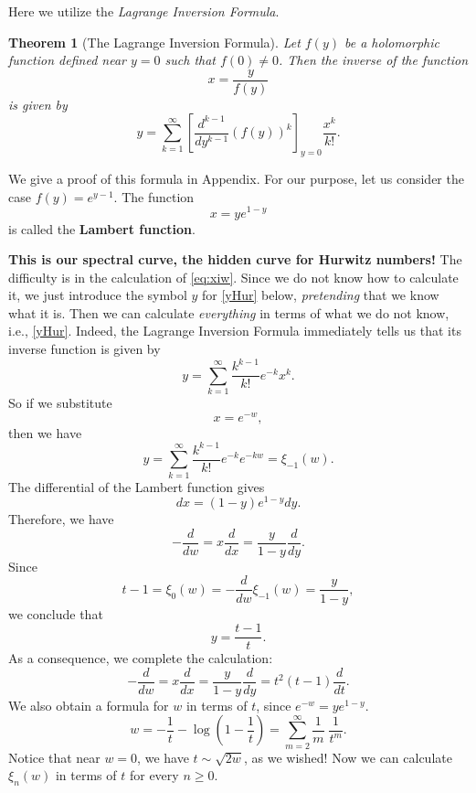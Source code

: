 \documentclass{amsart}
\newtheorem{thm}{Theorem}[section]
\theoremstyle{definition}
\numberwithin{equation}{section}
\numberwithin{figure}{section}
\newcommand{\be}{\begin{equation}}
\newcommand{\ee}{\end{equation}}
\begin{document}
Here we utilize the \emph{Lagrange Inversion Formula}.
\begin{thm}[The Lagrange Inversion Formula]
\label{thm:L}
Let $f(y)$ be a holomorphic function 
defined near $y=0$ such that $f(0)\ne 0$. 
Then the inverse of the function 
$$
x= \frac{y}{f(y)}
$$
is given by
$$
y=\sum_{k=1} ^\infty
\left[
\frac{d^{k-1}}{dy^{k-1}}(f(y))^k
\right]_{y=0}
\frac{x^k}{k!}.
$$
\end{thm}



We give a proof of this formula in Appendix.
For our purpose, let us consider 
the case $f(y) = e^{y-1}$. The function
\begin{equation}
\label{eq:Lambert}
x = y e^{1-y}
\end{equation}
is called the \textbf{Lambert function}. 


\textbf{This is our spectral curve, the hidden curve for Hurwitz numbers!}
The difficulty is in the calculation of \eqref{eq:xiw}. Since we do not know
how to calculate it, we just introduce the symbol $y$ for \eqref{yHur}
below, \emph{pretending} that we know what it is. Then we
can calculate \emph{everything} in terms of what we do not know, i.e.,
\eqref{yHur}. Indeed,
the Lagrange Inversion Formula 
immediately tells us that
its inverse function is given by
\be
\label{yHur}
y= \sum_{k=1} ^\infty \frac{k^{k-1}}{k!}e^{-k}
x^k.
\ee
So if we substitute 
\begin{equation}
\label{eq:x}
x = e^{-w},
\end{equation}
then we have
\begin{equation}
\label{eq:y}
y=\sum_{k=1} ^\infty \frac{k^{k-1}}{k!}e^{-k}
e^{-kw} = \xi_{-1}(w).
\end{equation}
The differential of the Lambert function gives
$$
dx = (1-y)e^{1-y} dy.
$$
Therefore, we have
\begin{equation}
\label{eq:wxy}
-\frac{d}{dw}=x\frac{d}{dx}=
\frac{y}{1-y}\frac{d}{dy}.
\end{equation}
Since 
$$
t-1 = \xi_0(w)=-\frac{d}{dw}\xi_{-1}(w) = 
\frac{y}{1-y},
$$
we conclude that
\begin{equation}
\label{eq:yint}
y=\frac{t-1}{t}.
\end{equation}
As a consequence, we complete the calculation:
\begin{equation}
\label{eq:wxyt}
-\frac{d}{dw}=x\frac{d}{dx}=
\frac{y}{1-y}\frac{d}{dy}
= t^2(t-1)\frac{d}{dt}.
\end{equation}
We also obtain a formula for $w$ in terms of $t$,
since $e^{-w}=ye^{1-y}$.
\begin{equation}
\label{eq:wint}
w=-\frac{1}{t}-\log\left(1-\frac{1}{t}\right)
=\sum_{m=2} ^\infty \frac{1}{m}\;\frac{1}{t^m}.
\end{equation}
Notice that near $w=0$, we have $t\sim \sqrt{2w}$,
as we wished!
Now we can calculate  $\xi_n(w)$ in terms of 
$t$ for every $n\ge 0$. 
\end{document}
